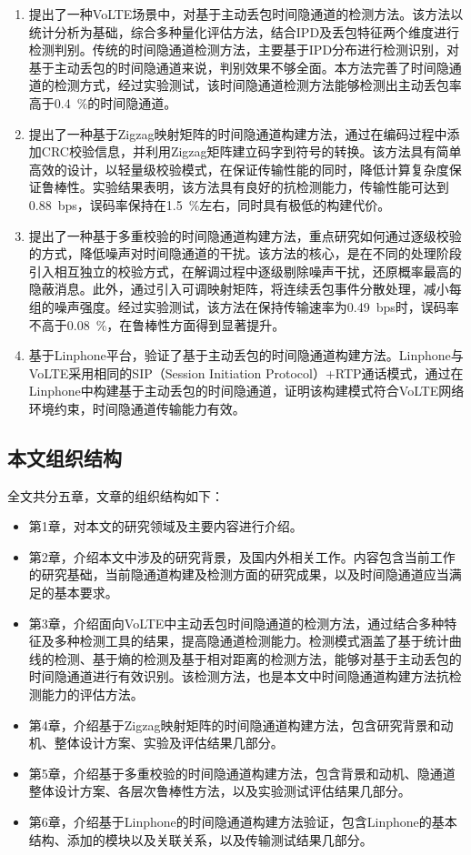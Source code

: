 \begin{enumerate}
    \item 提出了一种VoLTE场景中，对基于主动丢包时间隐通道的检测方法。该方法以统计分析为基础，综合多种量化评估方法，结合IPD及丢包特征两个维度进行检测判别。传统的时间隐通道检测方法，主要基于IPD分布进行检测识别，对基于主动丢包的时间隐通道来说，判别效果不够全面。本方法完善了时间隐通道的检测方式，经过实验测试，该时间隐通道检测方法能够检测出主动丢包率高于{0.4\ \%}的时间隐通道。
    \item 提出了一种基于Zigzag映射矩阵的时间隐通道构建方法，通过在编码过程中添加CRC校验信息，并利用Zigzag矩阵建立码字到符号的转换。该方法具有简单高效的设计，以轻量级校验模式，在保证传输性能的同时，降低计算复杂度保证鲁棒性。实验结果表明，该方法具有良好的抗检测能力，传输性能可达到{0.88\ bps}，误码率保持在{1.5\ \%}左右，同时具有极低的构建代价。
    \item 提出了一种基于多重校验的时间隐通道构建方法，重点研究如何通过逐级校验的方式，降低噪声对时间隐通道的干扰。该方法的核心，是在不同的处理阶段引入相互独立的校验方式，在解调过程中逐级剔除噪声干扰，还原概率最高的隐蔽消息。此外，通过引入可调映射矩阵，将连续丢包事件分散处理，减小每组的噪声强度。经过实验测试，该方法在保持传输速率为{0.49\ bps}时，误码率不高于{0.08\ \%}，在鲁棒性方面得到显著提升。
    \item 基于Linphone平台，验证了基于主动丢包的时间隐通道构建方法。Linphone与VoLTE采用相同的SIP（Session Initiation Protocol）+RTP通话模式，通过在Linphone中构建基于主动丢包的时间隐通道，证明该构建模式符合VoLTE网络环境约束，时间隐通道传输能力有效。
\end{enumerate}

\subsection{本文组织结构}
\label{sec:intro:work:struct}

全文共分五章，文章的组织结构如下：
\begin{itemize}
    \item 第1章，对本文的研究领域及主要内容进行介绍。
    \item 第2章，介绍本文中涉及的研究背景，及国内外相关工作。内容包含当前工作的研究基础，当前隐通道构建及检测方面的研究成果，以及时间隐通道应当满足的基本要求。
    \item 第3章，介绍面向VoLTE中主动丢包时间隐通道的检测方法，通过结合多种特征及多种检测工具的结果，提高隐通道检测能力。检测模式涵盖了基于统计曲线的检测、基于熵的检测及基于相对距离的检测方法，能够对基于主动丢包的时间隐通道进行有效识别。该检测方法，也是本文中时间隐通道构建方法抗检测能力的评估方法。
    \item 第4章，介绍基于Zigzag映射矩阵的时间隐通道构建方法，包含研究背景和动机、整体设计方案、实验及评估结果几部分。
    \item 第5章，介绍基于多重校验的时间隐通道构建方法，包含背景和动机、隐通道整体设计方案、各层次鲁棒性方法，以及实验测试评估结果几部分。
    \item 第6章，介绍基于Linphone的时间隐通道构建方法验证，包含Linphone的基本结构、添加的模块以及关联关系，以及传输测试结果几部分。
\end{itemize}